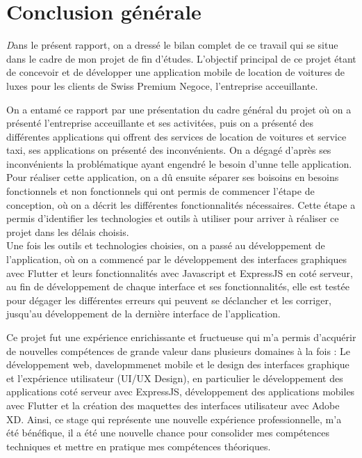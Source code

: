 \chapter*{Conclusion générale}
\vspace{1cm}
\justifying
\lettrine[findent=2pt,lines=3]{\textit{D}}{}ans le présent rapport, on a dressé le bilan complet de ce travail qui se situe dans le cadre de mon projet de fin d'études. L'objectif principal de ce projet étant de concevoir et de développer une application mobile de location de voitures de luxes pour les clients de Swiss Premium Negoce, l'entreprise acceuillante.

On a entamé ce rapport par une présentation du cadre général du projet où on a présenté l'entreprise acceuillante et ses activitées, puis on a présenté des différentes applications qui offrent des services de location de voitures et service taxi, ses applications on présenté des inconvénients. On a dégagé d'après ses inconvénients la problématique ayant engendré le besoin d'unne telle application. Pour réaliser cette application, on a dû ensuite séparer ses boisoins en besoins fonctionnels et non fonctionnels qui ont permis de commencer l'étape de conception, où on a décrit les différentes fonctionnalités nécessaires. Cette étape a permis d'identifier les technologies et outils à utiliser pour arriver à réaliser ce projet dans les délais choisis.\\
\noindent Une fois les outils et technologies choisies, on a passé au développement de l'application, où on a commencé par le développement des interfaces graphiques avec Flutter et leurs fonctionnalités avec Javascript et ExpressJS en coté serveur, au fin de développement de chaque interface et ses fonctionnalités, elle est testée pour dégager les différentes erreurs qui peuvent se déclancher et les corriger, jusqu'au développement de la dernière interface de l'application.

Ce projet fut une expérience enrichissante et fructueuse qui m'a permis d'acquérir de nouvelles compétences de grande valeur dans plusieurs domaines à la fois : Le développement web, davelopmmenet mobile et le design des interfaces graphique et l'expérience utilisateur (UI/UX Design), en particulier le développement des applications coté serveur avec ExpressJS, développement des applications mobiles avec Flutter et la création des maquettes des interfaces utilisateur avec Adobe XD. Ainsi, ce stage qui représente une nouvelle expérience professionnelle, m'a été bénéfique, il a été une nouvelle chance pour consolider mes compétences techniques et mettre en pratique mes compétences théoriques.

